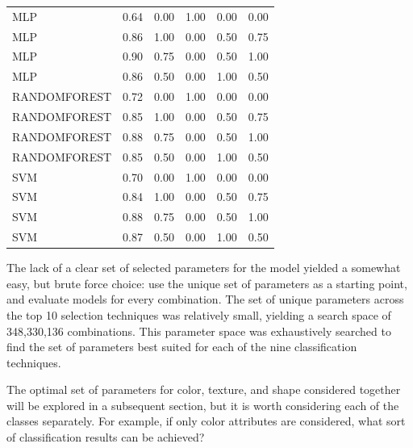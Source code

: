 \documentclass[letterpaper]{report}
\begin{document}
\begin{small}
{\begin{longtable}{lrrrrr}
         MLP & 0.64 &      0.00 & 1.00 &       0.00 &       0.00 \\
         MLP & 0.86 &      1.00 & 0.00 &       0.50 &       0.75 \\
         MLP & 0.90 &      0.75 & 0.00 &       0.50 &       1.00 \\
         MLP & 0.86 &      0.50 & 0.00 &       1.00 &       0.50 \\
RANDOMFOREST & 0.72 &      0.00 & 1.00 &       0.00 &       0.00 \\
RANDOMFOREST & 0.85 &      1.00 & 0.00 &       0.50 &       0.75 \\
RANDOMFOREST & 0.88 &      0.75 & 0.00 &       0.50 &       1.00 \\
RANDOMFOREST & 0.85 &      0.50 & 0.00 &       1.00 &       0.50 \\
         SVM & 0.70 &      0.00 & 1.00 &       0.00 &       0.00 \\
         SVM & 0.84 &      1.00 & 0.00 &       0.50 &       0.75 \\
         SVM & 0.88 &      0.75 & 0.00 &       0.50 &       1.00 \\
         SVM & 0.87 &      0.50 & 0.00 &       1.00 &       0.50 \\
\end{longtable}




}
\end{small}

The lack of a clear set of selected parameters for the model yielded a somewhat easy, but brute force choice: use the unique set of parameters as a starting point, and evaluate models for every combination. The set of unique parameters across the top 10 selection techniques was relatively small, yielding a search space of 348,330,136 combinations. This parameter space was exhaustively searched to find the set of parameters best suited for each of the  nine classification techniques.

The optimal set of parameters for color, texture, and shape considered together will be explored in a subsequent section, but it is worth considering each of the classes separately. For example, if only color attributes are considered, what sort of classification results can be achieved?
\end{document}
